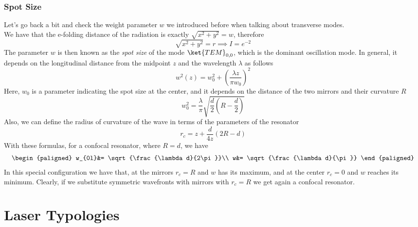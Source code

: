 \documentclass[../electromagnetism.tex]{subfiles}
\begin{document}
\subsubsection{Spot Size}
Let's go back a bit and check the weight parameter $w$ we introduced before when talking about transverse modes.\\
We have that the e-folding distance of the radiation is exactly $\sqrt{x^2+y^2}=w$, therefore
\begin{equation*}
	\sqrt{x^2+y^2}=r\implies I=e^{-2}
\end{equation*}
The parameter $w$ is then known as the \textit{spot size} of the mode $\ket{TEM}_{0, 0}$, which is the dominant oscillation mode. In general, it depends on the longitudinal distance from the midpoint $z$ and the wavelength $\lambda$ as follows
\begin{equation}
	w^2(z)=w_0^2+\left( \frac{\lambda z}{\pi w_0} \right)^2
	\label{eq:spotsize.res}
\end{equation}
Here, $w_0$ is a parameter indicating the spot size at the center, and it depends on the distance of the two mirrors and their curvature $R$
\begin{equation}
	w_0^2=\frac{\lambda}{\pi}\sqrt{\frac{d}{2}\left( R-\frac{d}{2} \right)}
	\label{eq:centerspot.res}
\end{equation}
Also, we can define the radius of curvature of the wave in terms of the parameters of the resonator
\begin{equation}
	r_c=z+\frac{d}{4z}\left( 2R-d \right)
	\label{eq:wavecurvature.res}
\end{equation}
With these formulas, for a confocal resonator, where $R=d$, we have
\begin{equation}
	\begin{paligned}
		w_{0l}&= \sqrt{\frac{\lambda d}{2\pi}}\\
		w&= \sqrt{\frac{\lambda d}{\pi}}
	\end{paligned}
	\label{eq:confocalspot.res}
\end{equation}
In this special configuration we have that, at the mirrors $r_c=R$ and $w$ has its maximum, and at the center $r_c=0$ and $w$ reaches its minimum. Clearly, if we substitute symmetric wavefronts with mirrors with $r_c=R$ we get again a confocal resonator.
\section{Laser Typologies}
\end{document}
